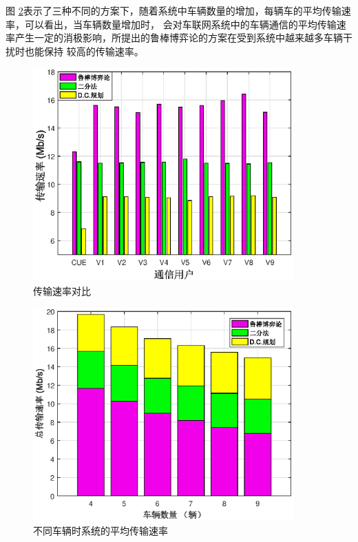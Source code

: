 图 \ref{不同车辆}表示了三种不同的方案下，随着系统中车辆数量的增加，每辆车的平均传输速率，可以看出，当车辆数量增加时，
会对车联网系统中的车辆通信的平均传输速率产生一定的消极影响，所提出的鲁棒博弈论的方案在受到系统中越来越多车辆干扰时也能保持
较高的传输速率。%
\begin{figure}[H]
\centering
\includegraphics[width=10cm]{figures//chap2//传输速率对比.eps}
\caption{传输速率对比}
\label{传输速率对比}
\end{figure}

\begin{figure}[H]
\centering
\includegraphics[width=10cm]{figures//chap2//不同车辆.eps}
\caption{不同车辆时系统的平均传输速率}
\label{不同车辆}
\end{figure}

